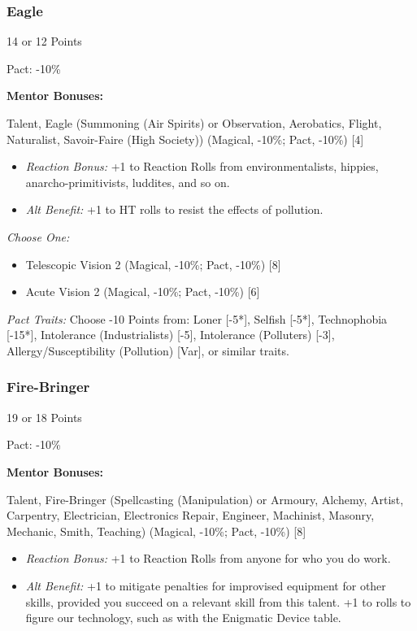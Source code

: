 \begin{multicols}{3}
	\subsubsection{Eagle}
	\begin{flushright}
		14 or 12 Points
	\end{flushright}
	Pact: -10\%
	
	
	\textbf{Mentor Bonuses:} 
	
	Talent, Eagle (Summoning (Air Spirits) or Observation, Aerobatics, Flight, Naturalist, Savoir-Faire (High Society)) (Magical, -10\%; Pact, -10\%) [4]
	\begin{itemize}
		\itemsep 0pt
		\item \textit{Reaction Bonus:} +1 to Reaction Rolls from environmentalists, hippies, anarcho-primitivists, luddites, and so on.
		\item \textit{Alt Benefit:} +1 to HT rolls to resist the effects of pollution. %
	\end{itemize}
	
	\textit{Choose One:}
	\begin{itemize}
		\itemsep 0pt
		\item Telescopic Vision 2 (Magical, -10\%; Pact, -10\%) [8]
		\item Acute Vision 2 (Magical, -10\%; Pact, -10\%) [6]
	\end{itemize}
	
	\textit{Pact Traits:} Choose -10 Points from: Loner [-5*], Selfish [-5*], Technophobia [-15*], Intolerance (Industrialists) [-5], Intolerance (Polluters) [-3], Allergy/Susceptibility (Pollution) [Var], or similar traits.
	
	\subsubsection{Fire-Bringer}
	\begin{flushright}
		19 or 18 Points
	\end{flushright}
	Pact: -10\%
	
	
	\textbf{Mentor Bonuses:} 
	
	Talent, Fire-Bringer (Spellcasting (Manipulation) or Armoury, Alchemy, Artist, Carpentry, Electrician, Electronics Repair, Engineer, Machinist, Masonry, Mechanic, Smith, Teaching) (Magical, -10\%; Pact, -10\%) [8]
	\begin{itemize}
		\itemsep 0pt
		\item \textit{Reaction Bonus:} +1 to Reaction Rolls from anyone for who you do work.
		\item \textit{Alt Benefit:} +1 to mitigate penalties for improvised equipment for other skills, provided you succeed on a relevant skill from this talent. +1 to rolls to figure our technology, such as with the Enigmatic Device table.
	\end{itemize}
	

\end{multicols}
